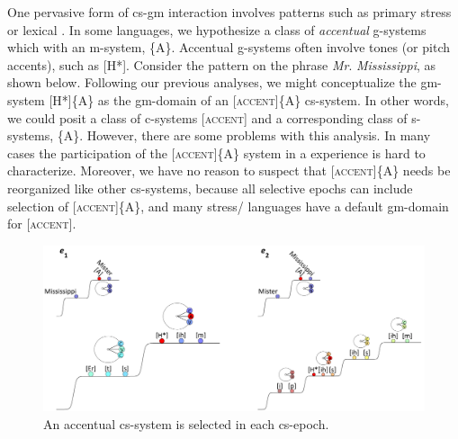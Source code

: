 One pervasive form of cs-gm interaction involves  patterns such as primary stress or lexical . In some languages, we hypothesize a class of \textit{accentual} g-systems which  with an  m-sys\-tem, \{A\}. Accentual g-systems often involve tones (or pitch accents), such as [H*]. Consider the  pattern on the phrase \textit{Mr}. \textit{Mississippi}, as shown below. Following our previous analyses, we might conceptualize the gm-sys\-tem [H*]\{A\} as the gm-domain of an  [\textsc{accent}]\{A\} cs-system. In other words, we could posit a class of  c-systems [\textsc{accent}] and a corresponding class of s-systems, \{A\}. However, there are some problems with this analysis. In many cases the participation of the [\textsc{accent}]\{A\} system in a  experience is hard to characterize. Moreover, we have no reason to suspect that [\textsc{accent}]\{A\} needs be reorganized like other cs-systems, because all selective epochs can include selection of [\textsc{accent}]\{A\}, and many stress/ languages have a default gm-domain for [\textsc{accent}].

  
\begin{figure}
\includegraphics[width=\textwidth]{figures/Tilsen-img63.png}
\caption{An accentual cs-system is selected in each cs-epoch.}
\label{fig:4:13}
\end{figure}
 

